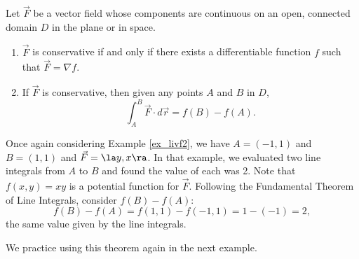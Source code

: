 {Let $\vec F$ be a vector field whose components are continuous on an open, connected domain $D$ in the plane or in space. 
\begin{enumerate}
	\item $\vec F$ is conservative if and only if there exists a differentiable function $f$ such that $\vec F = \nabla f$. 
	\item	If $\vec F$ is conservative, then given any points $A$ and $B$ in $D$, 
	$$\int_A^B \vec F\cdot d\vec r = f(B) - f(A).$$
\end{enumerate}
}

Once again considering Example \ref{ex_livf2}, we have $A = (-1,1)$ and $B = (1,1)$ and $\vec F = \la y,x\ra$. In that example, we evaluated two line integrals from $A$ to $B$ and found the value of each was 2. Note that $f(x,y) = xy$ is a potential function for $\vec F$. Following the Fundamental Theorem of Line Integrals, consider $f(B) - f(A)$:
$$f(B) - f(A) = f(1,1) - f(-1,1) = 1 - (-1) = 2,$$
the same value given by the line integrals.

We practice using this theorem again in the next example.\\

